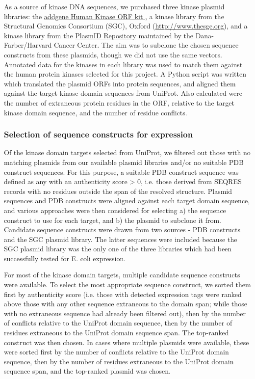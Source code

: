 \documentclass[aps,pre,twocolumn,nofootinbib,superscriptaddress,linenumbers]{revtex4-1}
\begin{document}
As a source of kinase DNA sequences, we purchased three kinase plasmid libraries: the \href{https://plasmid.med.harvard.edu/PLASMID/Home.xhtml}{addgene Human Kinase ORF kit }, a kinase library from the Structural Genomics Consortium (SGC), Oxford (\url{http://www.thesgc.org}), and a kinase library from the \href{https://plasmid.med.harvard.edu/PLASMID/Home.xhtml}{PlasmID Repository} maintained by the Dana-Farber/Harvard Cancer Center.
The aim was to subclone the chosen sequence constructs from these plasmids, though we did not use the same vectors.
Annotated data for the kinases in each library was used to match them against the human protein kinases selected for this project.
A Python script was written which translated the plasmid ORFs into protein sequences, and aligned them against the target kinase domain sequences from UniProt.
Also calculated were the number of extraneous protein residues in the ORF, relative to the target kinase domain sequence, and the number of residue conflicts.

\subsubsection{Selection of sequence constructs for expression}

Of the kinase domain targets selected from UniProt, we filtered out those with no matching plasmids from our available plasmid libraries and/or no suitable PDB construct sequences.
For this purpose, a suitable PDB construct sequence was defined as any with an authenticity score > 0, i.e. those derived from SEQRES records with no residues outside the span of the resolved structure.
Plasmid sequences and PDB constructs were aligned against each target domain sequence, and various approaches were then considered for selecting a) the sequence construct to use for each target, and b) the plasmid to subclone it from.
Candidate sequence constructs were drawn from two sources - PDB constructs and the SGC plasmid library.
The latter sequences were included because the SGC plasmid library was the only one of the three libraries which had been successfully tested for E. coli expression.

For most of the kinase domain targets, multiple candidate sequence constructs were available.
To select the most appropriate sequence construct, we sorted them first by authenticity score (i.e. those with detected expression tags were ranked above those with any other sequence extraneous to the domain span; while those with no extraneous sequence had already been filtered out), then by the number of conflicts relative to the UniProt domain sequence, then by the number of residues extraneous to the UniProt domain sequence span.
The top-ranked construct was then chosen.
In cases where multiple plasmids were available, these were sorted first by the number of conflicts relative to the UniProt domain sequence, then by the number of residues extraneous to the UniProt domain sequence span, and the top-ranked plasmid was chosen.
\end{document}
